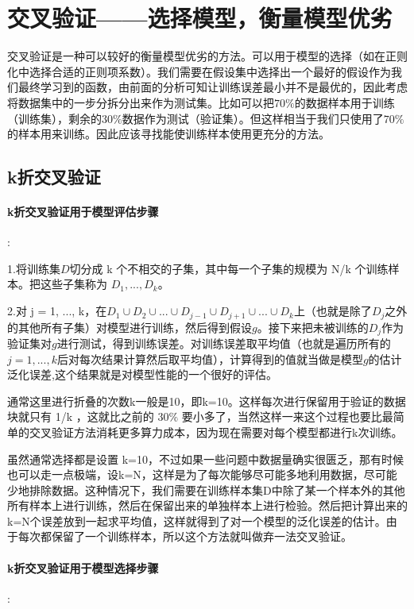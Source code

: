 \documentclass[forprint]{report}
\begin{document}
\section{交叉验证——选择模型，衡量模型优劣}
交叉验证是一种可以较好的衡量模型优劣的方法。可以用于模型的选择（如在正则化中选择合适的正则项系数）。我们需要在假设集中选择出一个最好的假设作为我们最终学习到的函数，由前面的分析可知让训练误差最小并不是最优的，因此考虑将数据集中的一步分拆分出来作为测试集。比如可以把$70\%$的数据样本用于训练（训练集），剩余的$30\%$数据作为测试（验证集）。但这样相当于我们只使用了$70\%$的样本用来训练。因此应该寻找能使训练样本使用更充分的方法。
\subsection{k折交叉验证}
\paragraph*{k折交叉验证用于模型评估步骤}:

\noindent
1.将训练集$D$切分成 k 个不相交的子集，其中每一个子集的规模为 N/k 个训练样本。把这些子集称为 $D_1,...,D_k$。

\noindent
2.对 j = 1, ..., k，在$D_1\cup D_2\cup ...\cup D_{j-1}\cup D_{j+1}\cup ...\cup D_k$上（也就是除了$D_j$之外的其他所有子集）对模型进行训练，然后得到假设$g$。接下来把未被训练的$D_j$作为验证集对$g$进行测试，得到训练误差。对训练误差取平均值（也就是遍历所有的$j=1,...,k$后对每次结果计算然后取平均值），计算得到的值就当做是模型$g$的估计泛化误差,这个结果就是对模型性能的一个很好的评估。

通常这里进行折叠的次数k一般是10，即k=10。这样每次进行保留用于验证的数据块就只有 1/k ，这就比之前的 $30\%$ 要小多了，当然这样一来这个过程也要比最简单的交叉验证方法消耗更多算力成本，因为现在需要对每个模型都进行k次训练。

虽然通常选择都是设置 k=10，不过如果一些问题中数据量确实很匮乏，那有时候也可以走一点极端，设k=N，这样是为了每次能够尽可能多地利用数据，尽可能少地排除数据。这种情况下，我们需要在训练样本集D中除了某一个样本外的其他所有样本上进行训练，然后在保留出来的单独样本上进行检验。然后把计算出来的k=N个误差放到一起求平均值，这样就得到了对一个模型的泛化误差的估计。由于每次都保留了一个训练样本，所以这个方法就叫做弃一法交叉验证。

\paragraph*{k折交叉验证用于模型选择步骤}:
\end{document}
